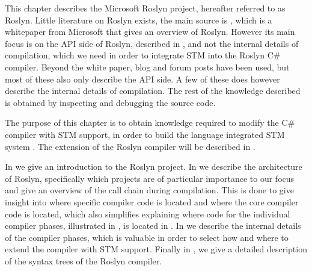 \makeatletter {}\makeatother
{}
This chapter describes the Microsoft Roslyn project, hereafter referred to as Roslyn. Little literature on Roslyn exists, the main source is \cite{ng2012roslyn}, which is a whitepaper from Microsoft that gives an overview of Roslyn. However its main focus is on the API side of Roslyn, described in , and not the internal details of compilation, which we need in order to integrate \ac{STM} into the Roslyn C\# compiler. Beyond the white paper, blog and forum posts have been used, but most of these also only describe the API side. A few of these does however describe the internal details of compilation. The rest of the knowledge described is obtained by inspecting and debugging the source code.

The purpose of this chapter is to obtain knowledge required to modify the C\# compiler with \ac{STM} support, in order to build the language integrated \ac{STM} system \stmname. The extension of the Roslyn compiler will be described in .

In  we give an introduction to the Roslyn project. In  we describe the architecture of Roslyn, specifically which projects are of particular importance to our focus and give an overview of the call chain during compilation. This is done to give insight into where specific compiler code is located and where the core compiler code is located, which also simplifies explaining where code for the individual compiler phases, illustrated in , is located in . In  we describe the internal details of the compiler phases, which is valuable in order to select how and where to extend the compiler with \ac{STM} support. Finally in , we give a detailed description of the syntax trees of the Roslyn compiler.%


